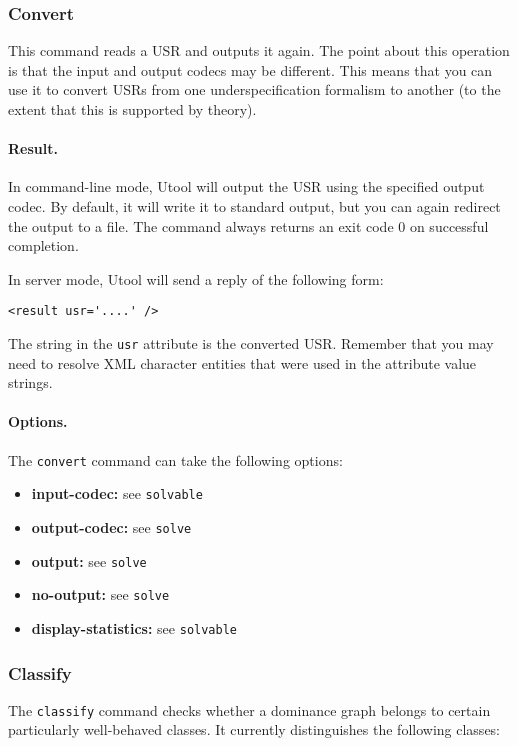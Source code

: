 \subsubsection{Convert}

This command reads a USR and outputs it again. The point about this
operation is that the input and output codecs may be different. This
means that you can use it to convert USRs from one underspecification
formalism to another (to the extent that this is supported by theory).

\paragraph{Result.}
In command-line mode, Utool will output the USR using the specified
output codec. By default, it will write it to standard output, but you
can again redirect the output to a file. The command always returns an
exit code 0 on successful completion.

In server mode, Utool will send a reply of the following form:
\begin{verbatim}
<result usr='....' />
\end{verbatim}

The string in the \verb?usr? attribute is the converted USR. Remember
that you may need to resolve XML character entities that were used in
the attribute value strings.

\paragraph{Options.}
The \verb?convert? command can take the following options:
\begin{itemize}
\item \textbf{input-codec:} see \verb?solvable? 
\item \textbf{output-codec:} see \verb?solve? 
\item \textbf{output:} see \verb?solve?
\item \textbf{no-output:} see \verb?solve?
\item \textbf{display-statistics:} see \verb?solvable?
\end{itemize}




\subsubsection{Classify} \label{sec:op-classify}

The \verb?classify? command checks whether a dominance graph belongs
to certain particularly well-behaved classes. It currently
distinguishes the following classes:

